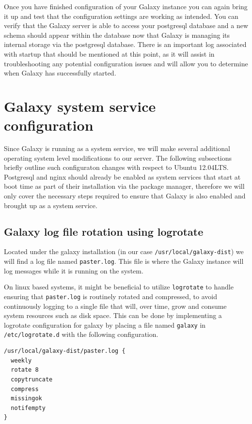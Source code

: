 \documentclass[a4paper,10pt]{article}
\begin{document}
Once you have finished configuration of your Galaxy instance you can again bring it up and test that the configuration settings are working as intended.  You can verify that the Galaxy server is able to access your postgresql database and a new schema should appear within the database now that Galaxy is managing its internal storage via the postgresql database.  There is an important log associated with startup that should be mentioned at this point, as it will assist in troubleshooting any potential configuration issues and will allow you to determine when Galaxy has successfully started.

\section{Galaxy system service configuration}
Since Galaxy is running as a system service, we will make several additional operating system level modifications to our server.  The following subsections briefly outline such configuraton changes with respect to Ubuntu 12.04LTS.  Postgresql and nginx should already be enabled as system services that start at boot time as part of their installation via the package manager, therefore we will only cover the necessary steps required to ensure that Galaxy is also enabled and brought up as a system service.

\subsection{Galaxy log file rotation using logrotate}
Located under the galaxy installation (in our case \texttt{\footnotesize{/usr/local/galaxy-dist}})  we will find a log file named \texttt{\footnotesize{paster.log}}.  This file is where the Galaxy instance will log messages while it is running on the system.

On linux based systems, it might be beneficial to utilize \texttt{\footnotesize{logrotate}} to handle ensuring that \texttt{\footnotesize{paster.log}} is routinely rotated and compressed, to avoid continuously logging to a single file that will, over time, grow and consume system resources such as disk space.  This can be done by implementing a logrotate configuration for galaxy by placing a file named \texttt{\footnotesize{galaxy}} in \texttt{\footnotesize{/etc/logrotate.d}} with the following configuration.

\begin{lstlisting}
/usr/local/galaxy-dist/paster.log {
  weekly
  rotate 8
  copytruncate
  compress
  missingok
  notifempty
}
\end{lstlisting}
\end{document}
